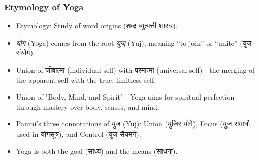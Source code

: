 \begin{frame}[fragile]\frametitle{Etymology of Yoga}

  \begin{itemize}
    \item Etymology: Study of word origins (शब्द व्युत्पत्ती शास्त्र).
	\item \textit{योग} (Yoga) comes from the root \textit{युज्} (Yuj), meaning “to join” or “unite” (युज संयोग).
	\item Union of जीवात्मा (individual self) with परमात्मा (universal self)—the merging of the apparent self with the true, limitless self.
    \item Union of "Body, Mind, and Spirit"—Yoga aims for spiritual perfection through mastery over body, senses, and mind.
	\item Panini’s three connotations of युज (Yuj): Union (युजिर योगे), Focus (युज समाधौ, used in योगसूत्र), and Control (युज सैयमने).
	\item Yoga is both the goal (साध्य) and the means (साधना).
  \end{itemize}

\end{frame}


